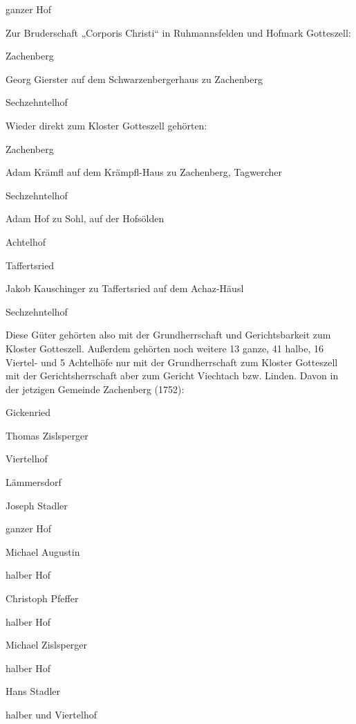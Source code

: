 \documentclass{book}
\begin{document}
ganzer Hof



Zur Bruderschaft „Corporis Christi“ in Ruhmannsfelden und Hofmark Gotteszell:



Zachenberg

Georg Gierster auf dem Schwarzenbergerhaus zu Zachenberg

Sechzehntelhof



Wieder direkt zum Kloster Gotteszell gehörten:



Zachenberg

Adam Krämfl auf dem Krämpfl-Haus zu Zachenberg, Tagwercher

Sechzehntelhof



Adam Hof zu Sohl, auf der Hofsölden

Achtelhof

Taffertsried

Jakob Kauschinger zu Taffertsried auf dem Achaz-Häusl

Sechzehntelhof



Diese Güter gehörten also mit der Grundherrschaft und Gerichtsbarkeit zum
Kloster Gotteszell. Außerdem gehörten noch weitere 13 ganze, 41 halbe, 16
Viertel- und 5 Achtelhöfe nur mit der Grundherrschaft zum Kloster Gotteszell mit
der Gerichtsherrschaft aber zum Gericht Viechtach bzw. Linden. Davon in der
jetzigen Gemeinde Zachenberg (1752):



Gickenried

Thomas Zislsperger

Viertelhof

Lämmersdorf

Joseph Stadler

ganzer Hof



Michael Augustin

halber Hof



Christoph Pfeffer

halber Hof



Michael Zislsperger

halber Hof



Hans Stadler

halber und Viertelhof
\end{document}
